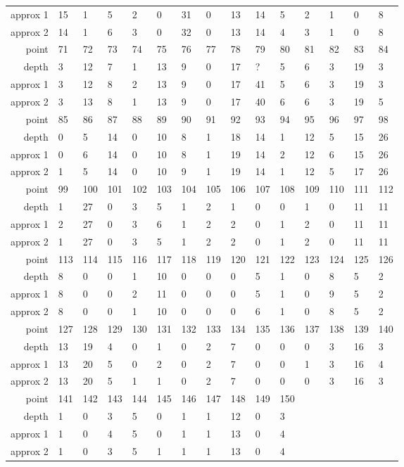 \begin{center}
\begin{supertabular}{|r|l l l l l l l l l l l l l l|}
approx 1 & 15 & 1 & 5 & 2 & 0 & 31 & 0 & 13 & 14 & 5 & 2 & 1 & 0 & 8 \\
approx 2 & 14 & 1 & 6 & 3 & 0 & 32 & 0 & 13 & 14 & 4 & 3 & 1 & 0 & 8 \\
\hline
point & 71 & 72 & 73 & 74 & 75 & 76 & 77 & 78 & 79 & 80 & 81 & 82 & 83 & 84 \\
\hline
depth & 3 & 12 & 7 & 1 & 13 & 9 & 0 & 17 & ? & 5 & 6 & 3 & 19 & 3 \\
approx 1 & 3 & 12 & 8 & 2 & 13 & 9 & 0 & 17 & 41 & 5 & 6 & 3 & 19 & 3 \\
approx 2 & 3 & 13 & 8 & 1 & 13 & 9 & 0 & 17 & 40 & 6 & 6 & 3 & 19 & 5 \\
\hline
point & 85 & 86 & 87 & 88 & 89 & 90 & 91 & 92 & 93 & 94 & 95 & 96 & 97 & 98 \\
\hline
depth & 0 & 5 & 14 & 0 & 10 & 8 & 1 & 18 & 14 & 1 & 12 & 5 & 15 & 26 \\
approx 1 & 0 & 6 & 14 & 0 & 10 & 8 & 1 & 19 & 14 & 2 & 12 & 6 & 15 & 26 \\
approx 2 & 1 & 5 & 14 & 0 & 10 & 9 & 1 & 19 & 14 & 1 & 12 & 5 & 17 & 26 \\
\hline
point & 99 & 100 & 101 & 102 & 103 & 104 & 105 & 106 & 107 & 108 & 109 & 110 & 111 & 112 \\
\hline
depth & 1 & 27 & 0 & 3 & 5 & 1 & 2 & 1 & 0 & 0 & 1 & 0 & 11 & 11 \\
approx 1 & 2 & 27 & 0 & 3 & 6 & 1 & 2 & 2 & 0 & 1 & 2 & 0 & 11 & 11 \\
approx 2 & 1 & 27 & 0 & 3 & 5 & 1 & 2 & 2 & 0 & 1 & 2 & 0 & 11 & 11 \\
\hline
point & 113 & 114 & 115 & 116 & 117 & 118 & 119 & 120 & 121 & 122 & 123 & 124 & 125 & 126 \\
\hline
depth & 8 & 0 & 0 & 1 & 10 & 0 & 0 & 0 & 5 & 1 & 0 & 8 & 5 & 2 \\
approx 1 & 8 & 0 & 0 & 2 & 11 & 0 & 0 & 0 & 5 & 1 & 0 & 9 & 5 & 2 \\
approx 2 & 8 & 0 & 0 & 1 & 10 & 0 & 0 & 0 & 6 & 1 & 0 & 8 & 5 & 2 \\
\hline
point & 127 & 128 & 129 & 130 & 131 & 132 & 133 & 134 & 135 & 136 & 137 & 138 & 139 & 140 \\
\hline
depth & 13 & 19 & 4 & 0 & 1 & 0 & 2 & 7 & 0 & 0 & 0 & 3 & 16 & 3 \\
approx 1 & 13 & 20 & 5 & 0 & 2 & 0 & 2 & 7 & 0 & 0 & 1 & 3 & 16 & 4 \\
approx 2 & 13 & 20 & 5 & 1 & 1 & 0 & 2 & 7 & 0 & 0 & 0 & 3 & 16 & 3 \\
\hline
point & 141 & 142 & 143 & 144 & 145 & 146 & 147 & 148 & 149 & 150 & & & & \\
\hline
depth & 1 & 0 & 3 & 5 & 0 & 1 & 1 & 12 & 0 & 3 & & & & \\
approx 1 & 1 & 0 & 4 & 5 & 0 & 1 & 1 & 13 & 0 & 4 & & & & \\
approx 2 & 1 & 0 & 3 & 5 & 1 & 1 & 1 & 13 & 0 & 4 & & & & \\
  \end{supertabular}
  \label{tab:test.iris}
\end{center}


